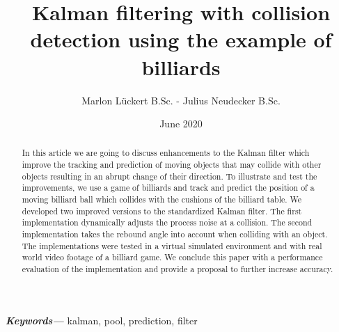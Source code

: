 \documentclass[notitlepage, a4paper, 11pt]{scrartcl}
\providecommand{\keywords}[1]
{
  \small	
  \textbf{\textit{Keywords---}} #1
}
\begin{document}
\title{Kalman filtering with collision detection using the example of billiards}
\author{Marlon Lückert B.Sc. - Julius Neudecker B.Sc.}
\date{June 2020}

\maketitle

\begin{abstract}
In this article we are going to discuss enhancements to the Kalman filter \cite{kalman} which improve the tracking and prediction of moving objects
that may collide with other objects resulting in an abrupt change of their direction.
To illustrate and test the improvements, we use a game of billiards and track and predict the position of a moving billiard ball which collides with the cushions of the billiard table.
We developed two improved versions to the standardized Kalman filter.
The first implementation dynamically adjusts the process noise at a collision.
The second implementation takes the rebound angle into account when colliding with an object. 
The implementations were tested in a virtual simulated environment and with real world video footage of a billiard game.
We conclude this paper with a performance evaluation of the implementation and provide a proposal to further increase accuracy.

\end{abstract}

\keywords{kalman, pool, prediction, filter}
\end{document}
